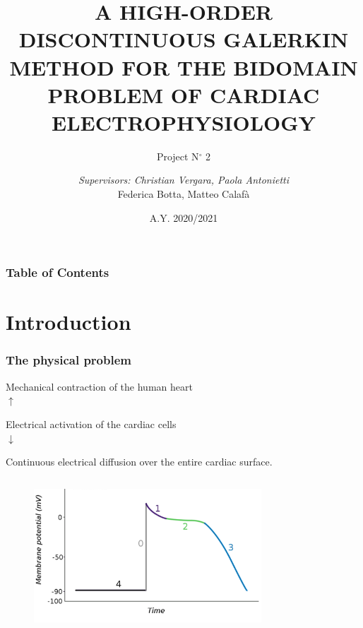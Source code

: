 \documentclass[8pt]{beamer}
\title[\color{white}{Project N°2}]{A HIGH-ORDER DISCONTINUOUS GALERKIN METHOD FOR THE BIDOMAIN PROBLEM OF CARDIAC ELECTROPHYSIOLOGY}
\subtitle{Project N$^\circ$ 2}
\author[Federica Botta \and Matteo Calafà]{\small{\textit{Supervisors: Christian Vergara, Paola Antonietti}}\\ \vspace{4mm} Federica Botta, Matteo Calafà}
\institute[Politecnico di Milano]{\scriptsize{Course of Numerical Analysis for Partial Differential Equations}}
\date{\tiny{A.Y. 2020/2021}}
\begin{document}
\frame{\titlepage}

\begin{frame}
\frametitle{Table of Contents}
\tableofcontents
\end{frame}

\section{Introduction}
\begin{frame}
\frametitle{The physical problem}
\begin{center}
Mechanical contraction of the human heart\\

$\uparrow$

Electrical activation of the cardiac cells\\

$\downarrow$

Continuous electrical diffusion over the entire cardiac surface.\\
\end{center}
\begin{columns}
            \begin{column}{0.5\textwidth}
                  \begin{figure}[t]
                  \includegraphics[width = 0.8\textwidth]{./potential_cycle.png}
                  \centering
                  \end{figure}
            \end{column}
            \begin{column}{0.5\textwidth}  
                  \centering
            \end{column}
     \end{columns}
\end{frame}
\end{document}
